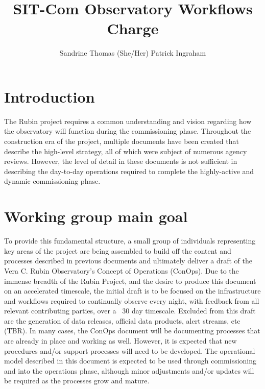 \documentclass[SE,authoryear,toc]{lsstdoc}
\title{SIT-Com Observatory Workflows Charge}
\author{%
Sandrine Thomas (She/Her)
Patrick Ingraham
}
\date{\vcsDate}
\begin{document}
\maketitle



\section{Introduction}
The Rubin project requires a common understanding and vision regarding how the observatory will function during the commissioning phase. 
Throughout the construction era of the project, multiple documents have been created that describe the high-level strategy, all of which were subject of numerous agency reviews. 
However, the level of detail in these documents is not sufficient in describing the day-to-day operations required to complete the highly-active and dynamic commissioning phase. 

\section{Working group main goal}
To provide this fundamental structure, a small group of individuals representing key areas of the project are being assembled to build off the content and processes described in previous documents and ultimately deliver a draft of the Vera C. Rubin Observatory's Concept of Operations (ConOps).
Due to the immense breadth of the Rubin Project, and the desire to produce this document on an accelerated timescale, the initial draft is to be focused on the infrastructure and workflows required to continually observe every night, with feedback from all relevant contributing parties, over a ~30 day timescale. 
Excluded from this draft are the generation of data releases, official data products, alert streams, etc (TBR). 
In many cases, the ConOps document will be documenting processes that are already in place and working as well. 
However, it is expected that new procedures and/or support processes will need to be developed. 
The operational model described in this document is expected to be used through commissioning and into the operations phase, although minor adjustments and/or updates will be required as the processes grow and mature.
\end{document}
